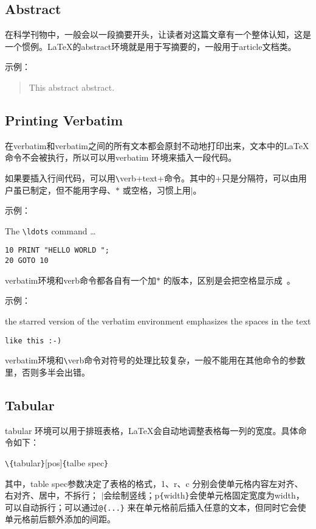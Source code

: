 \documentclass[UTF8]{ctexart}
\begin{document}
\subsection{Abstract}
在科学刊物中，一般会以一段摘要开头，让读者对这篇文章有一个整体认知，这是一个惯例。\LaTeX 的abstract环境就是用于写摘要的，一般用于article文档类。

示例：
\begin{abstract}
This abstract abstract.
\end{abstract}

\subsection{Printing Verbatim}
  在verbatim和verbatim之间的所有文本都会原封不动地打印出来，文本中的\LaTeX 命令不会被执行，所以可以用verbatim 环境来插入一段代码。

  如果要插入行间代码，可以用\texttt{\textbackslash}verb+text+命令。其中的+只是分隔符，可以由用户虽已制定，但不能用字母、$\ast$ 或空格，习惯上用$\mid$。

示例：

The \verb|\ldots| command \ldots

\begin{verbatim}
10 PRINT "HELLO WORLD ";
20 GOTO 10
\end{verbatim}

verbatim环境和verb命令都各自有一个加$\ast$ 的版本，区别是会把空格显示成\verb*| |。

示例：

\begin{verbatim*}
the starred version of
the       verbatim
environment emphasizes
the spaces   in the text
\end{verbatim*}

\verb*|like this :-) |

verbatim环境和\texttt{\textbackslash}verb命令对符号的处理比较复杂，一般不能用在其他命令的参数里，否则多半会出错。
\subsection{Tabular}
tabular 环境可以用于排班表格，\LaTeX 会自动地调整表格每一列的宽度。具体命令如下：

\qquad \texttt{\textbackslash}\texttt{\{}tabular\texttt{\}}[pos]\texttt{\{}talbe spec\texttt{\}}

\qquad 其中，table spec参数决定了表格的格式，1、r、c 分别会使单元格内容左对齐、右对齐、居中，不拆行；
$\mid$会绘制竖线；p\texttt{\{}width\texttt{\}}会使单元格固定宽度为width，可以自动拆行；可以通过\texttt{@\{...\}}
来在单元格前后插入任意的文本，但同时它会使单元格前后额外添加的间距。
\end{document}
